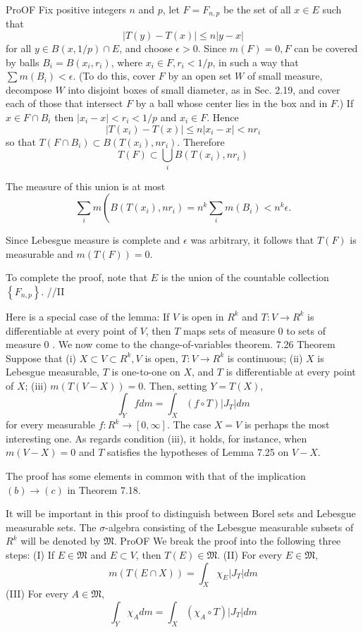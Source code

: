 ProOF Fix positive integers $n$ and $p$, let $F=F_{n, p}$ be the set of all $x \in E$ such that
$$
|T(y)-T(x)| \leq n|y-x|
$$
for all $y \in B(x, 1 / p) \cap E$, and choose $\epsilon>0$. Since $m(F)=0, F$ can be covered by balls $B_i=B\left(x_i, r_i\right)$, where $x_i \in F, r_i<1 / p$, in such a way that $\sum m\left(B_i\right)<\epsilon$. (To do this, cover $F$ by an open set $W$ of small measure, decompose $W$ into disjoint boxes of small diameter, as in Sec. 2.19, and cover each of those that intersect $F$ by a ball whose center lies in the box and in $F$.)
If $x \in F \cap B_i$ then $\left|x_i-x\right|<r_i<1 / p$ and $x_i \in F$. Hence
$$
\left|T\left(x_i\right)-T(x)\right| \leq n\left|x_i-x\right|<n r_i
$$
so that $T\left(F \cap B_i\right) \subset B\left(T\left(x_i\right), n r_i\right)$. Therefore
$$
T(F) \subset \bigcup_i B\left(T\left(x_i\right), n r_i\right)
$$

The measure of this union is at most
$$
\sum_i m\left(B\left(T\left(x_i\right), n r_i\right)=n^k \sum_i m\left(B_i\right)<n^k \epsilon .\right.
$$

Since Lebesgue measure is complete and $\epsilon$ was arbitrary, it follows that $T(F)$ is measurable and $m(T(F))=0$.

To complete the proof, note that $E$ is the union of the countable collection $\left\{F_{n, p}\right\}$.
//II

Here is a special case of the lemma:
If $V$ is open in $R^k$ and $T: V \rightarrow R^k$ is differentiable at every point of $V$, then $T$ maps sets of measure 0 to sets of measure 0 .
We now come to the change-of-variables theorem.
7.26 Theorem Suppose that
(i) $X \subset V \subset R^k, V$ is open, $T: V \rightarrow R^k$ is continuous;
(ii) $X$ is Lebesgue measurable, $T$ is one-to-one on $X$, and $T$ is differentiable at every point of $X$;
(iii) $m(T(V-X))=0$.
Then, setting $Y=T(X)$,
$$
\int_Y f d m=\int_X(f \circ T)\left|J_T\right| d m
$$
for every measurable $f: R^k \rightarrow[0, \infty]$.
The case $X=V$ is perhaps the most interesting one. As regards condition (iii), it holds, for instance, when $m(V-X)=0$ and $T$ satisfies the hypotheses of Lemma 7.25 on $V-X$.

The proof has some elements in common with that of the implication $(b) \rightarrow(c)$ in Theorem 7.18.

It will be important in this proof to distinguish between Borel sets and Lebesgue measurable sets. The $\sigma$-algebra consisting of the Lebesgue measurable subsets of $R^k$ will be denoted by $\mathfrak{M}$.
ProOF We break the proof into the following three steps:
(I) If $E \in \mathfrak{M}$ and $E \subset V$, then $T(E) \in \mathfrak{M}$.
(II) For every $E \in \mathfrak{M}$,
$$
m(T(E \cap X))=\int_X \chi_E\left|J_T\right| d m
$$
(III) For every $A \in \mathfrak{M}$,
$$
\int_Y \chi_A d m=\int_X\left(\chi_A \circ T\right)\left|J_T\right| d m
$$

